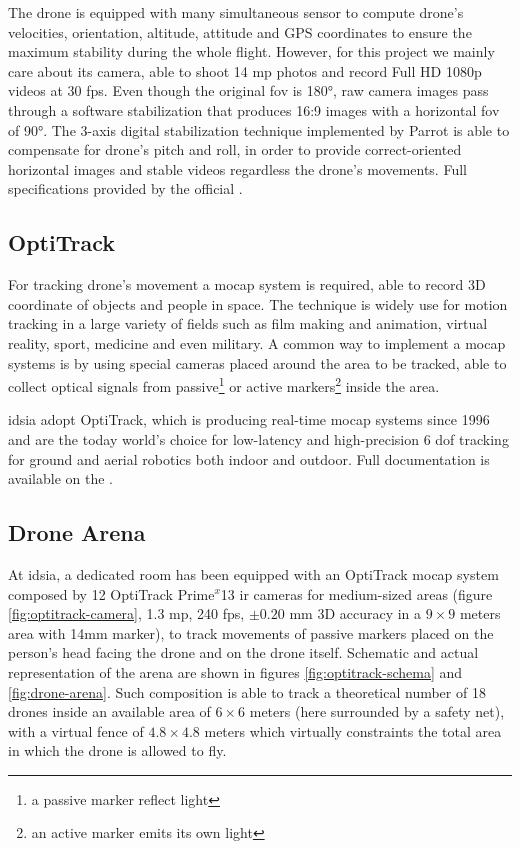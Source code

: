 The drone is equipped with many simultaneous sensor to compute drone's velocities, orientation, altitude, attitude and GPS coordinates to ensure the maximum stability during the whole flight. However, for this project we mainly care about its camera, able to shoot 14 \gls{mp} photos and record Full HD 1080p videos at 30 \gls{fps}. Even though the original \gls{fov} is 180°, raw camera images pass through a software stabilization that produces 16:9 images with a horizontal \gls{fov} of 90°. The 3-axis digital stabilization technique implemented by Parrot is able to compensate for drone's pitch and roll, in order to provide correct-oriented horizontal images and stable videos regardless the drone's movements. Full specifications provided by the official \cite{bebop}.

  

\subsection{OptiTrack}
\label{subsec:optitrack}

For tracking drone's movement a \gls{mocap} system is required, able to record 3D coordinate of objects and people in space. The technique is widely use for motion tracking in a large variety of fields such as film making and animation, virtual reality, sport, medicine and even military. A common way to implement a \gls{mocap} systems is by using special cameras placed around the area to be tracked, able to collect optical signals from passive\footnote{a passive marker reflect light} or active markers\footnote{an active marker emits its own light} inside the area.

\medskip

\gls{idsia} adopt OptiTrack, which is producing real-time \gls{mocap} systems since 1996 and are the today world’s choice for low-latency and high-precision 6 \gls{dof} tracking for ground and aerial robotics both indoor and outdoor. Full documentation is available on the \cite{optitrack}.



\subsection{Drone Arena}
\label{subsec:drone-arena}

At \gls{idsia}, a dedicated room has been equipped with an OptiTrack \gls{mocap} system composed by 12 OptiTrack Prime$^x$13 \gls{ir} cameras for medium-sized areas (figure \ref{fig:optitrack-camera}, 1.3 \gls{mp}, 240 \gls{fps}, $\pm0.20$ mm 3D accuracy in a $9 \times 9$ meters area with 14mm marker), to track movements of passive markers placed on the person's head facing the drone and on the drone itself. Schematic and actual representation of the arena are shown in figures \ref{fig:optitrack-schema} and \ref{fig:drone-arena}. Such composition is able to track a theoretical number of 18 drones inside an available area of $6 \times 6$ meters (here surrounded by a safety net), with a virtual fence of $4.8 \times 4.8$ meters which virtually constraints the total area in which the drone is allowed to fly.

